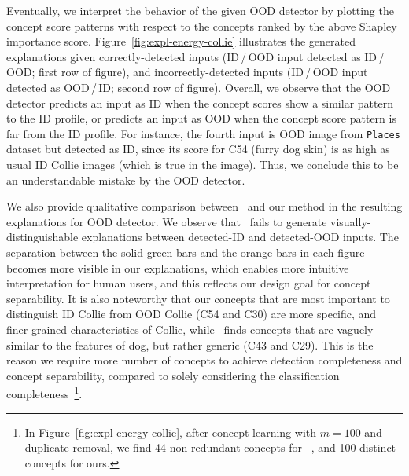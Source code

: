 Eventually, we interpret the behavior of the given OOD detector by plotting the concept score patterns with respect to the concepts ranked by the above Shapley importance score.
Figure~\ref{fig:expl-energy-collie} illustrates the generated explanations given correctly-detected inputs (ID\,/\,OOD input detected as ID\,/\,OOD; first row of figure), and incorrectly-detected inputs (ID\,/\,OOD input detected as OOD\,/\,ID; second row of figure).
Overall, we observe that the OOD detector predicts an input as ID when the concept scores show a similar pattern to the ID profile, or predicts an input as OOD when the concept score pattern is far from the ID profile.
For instance, the fourth input is OOD image from \texttt{Places} dataset but detected as ID, since its score for C54 (furry dog skin) is as high as usual ID Collie images (which is true in the image). Thus, we conclude this to be an understandable mistake by the OOD detector.

We also provide qualitative comparison between~\citet{yeh2020completeness} and our method in the resulting explanations for OOD detector.
We observe that~\citet{yeh2020completeness} fails to generate visually-distinguishable explanations between detected-ID and detected-OOD inputs.
The separation between the solid green bars and the orange bars in each figure becomes more visible in our explanations, which enables more intuitive interpretation for human users, and this reflects our design goal for concept separability.
It is also noteworthy that our concepts that are most important to distinguish ID Collie from OOD Collie (\ie C54 and C30) are more specific, and finer-grained characteristics of Collie, while~\citet{yeh2020completeness} finds concepts that are vaguely similar to the features of dog, but rather generic (\ie C43 and C29).
This is the reason we require more number of concepts to achieve detection completeness and concept separability, compared to solely considering the classification completeness~\footnote{In Figure~\ref{fig:expl-energy-collie}, after concept learning with $m = 100$ and duplicate removal, we find 44 non-redundant concepts for ~\citet{yeh2020completeness}, and 100 distinct concepts for ours.}.


\iffalse

